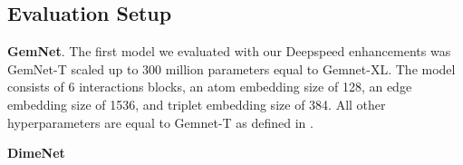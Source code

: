 \subsection{Evaluation Setup}

\textbf{GemNet}. The first model we evaluated with our Deepspeed enhancements was GemNet-T 
scaled up to 300 million parameters equal to Gemnet-XL\cite*{https://doi.org/10.48550/arxiv.2203.09697}.
The model consists of 6 interactions blocks, an atom embedding size of 128, an edge embedding size of 1536, 
and triplet embedding size of 384. All other hyperparameters are equal to Gemnet-T as defined in 
\cite*{https://doi.org/10.48550/arxiv.2106.08903}.

\textbf{DimeNet}